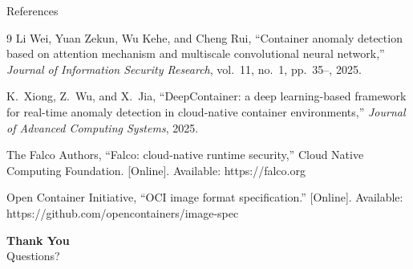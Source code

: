 \documentclass[aspectratio=169, 11pt]{beamer}
\begin{document}
\begin{frame}[allowframebreaks]{References}
\begin{thebibliography}{9}
Li Wei, Yuan Zekun, Wu Kehe, and Cheng Rui,
``Container anomaly detection based on attention mechanism and multiscale
convolutional neural network,''
\emph{Journal of Information Security Research}, vol.~11, no.~1, pp.~35--, 2025.

K.~Xiong, Z.~Wu, and X.~Jia,
``DeepContainer: a deep learning-based framework for real-time anomaly
detection in cloud-native container environments,''
\emph{Journal of Advanced Computing Systems}, 2025.

The Falco Authors,
``Falco: cloud-native runtime security,''
Cloud Native Computing Foundation. [Online]. Available: https://falco.org

Open Container Initiative,
``OCI image format specification.'' [Online].
Available: https://github.com/opencontainers/image-spec

\end{thebibliography}
\end{frame}

\begin{frame}
    \centering
    {\Huge \textbf{\textcolor{amritaMaroon}{Thank You}}}\\[0.3cm]
    {\large Questions?}
\end{frame}
\end{document}
